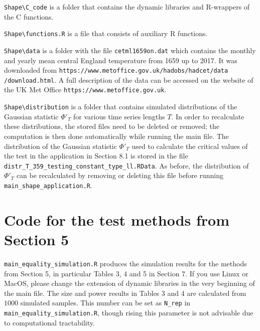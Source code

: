 \documentclass[a4paper,12pt]{article}
\begin{document}
\verb|Shape\C_code| \hspace{1pt} is a folder that contains the dynamic libraries and R-wrappers of the C functions.

\verb|Shape\functions.R| \hspace{1pt} is a file that consists of auxiliary R functions.

\verb|Shape\data| \hspace{1pt} is a folder with the file \verb|cetml1659on.dat| which contains the monthly and yearly mean central England temperature from 1659 up to 2017. It was downloaded from \verb|https://www.metoffice.gov.uk/hadobs/hadcet/data| \verb|/download.html|. A full description of the data can be accessed on the website of the UK Met Office \verb|https://www.metoffice.gov.uk|. 

\verb|Shape\distribution| \hspace{1pt} is a folder that  contains simulated distributions of the Gaussian statistic $\Phi'_{T}$ for various time series lengths $T$. In order to recalculate these distributions, the stored files need to be deleted or removed; the computation is then done automatically while running the main file. The distribution of the Gaussian statistic $\Phi'_T$ used to calculate the critical values of the test in the application in Section 8.1 is stored in the file \verb|distr_T_359_testing_constant_type_ll.RData|. As before, the distribution of $\Phi'_T$ can be recalculated by removing or deleting this file before running \verb|main_shape_application.R|.  
\vspace{0.2cm}



\section*{Code for the test methods from Section 5}


\everypar{\hangafter=1\hangindent=1.45cm\relax}

\verb|main_equality_simulation.R| \hspace{1pt} produces the simulation results for the methods from Section 5, in particular Tables 3, 4 and 5 in Section 7. If you use Linux or MacOS, please change the extension of dynamic libraries in the very beginning of the main file. The size and power results in Tables 3 and 4 are calculated from $1000$ simulated samples. This number can be set as \verb|N_rep| in \verb|main_equality_simulation.R|, though rising this parameter is not advisable due to computational tractability. 
\end{document}
